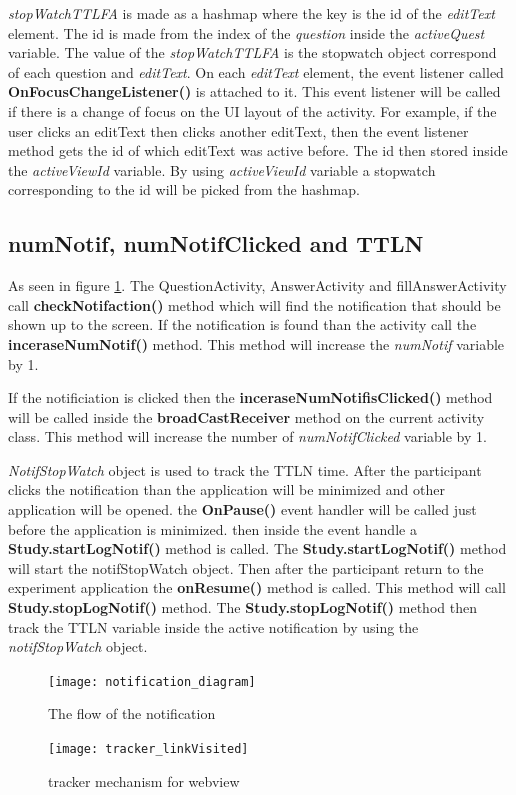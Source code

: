 \textit{stopWatchTTLFA} is made as a hashmap where the key is the id of the \textit{editText} element.
The id is made from the index of the \textit{question} inside the \textit{activeQuest} variable.
The value of the \textit{stopWatchTTLFA} is the stopwatch object correspond of each question and \textit{editText}.
On each \textit{editText} element, the event listener called \textbf{OnFocusChangeListener()} is attached to it. This event listener will be called if there is a
change of focus on the UI layout of the activity. For example, if the user clicks an editText then clicks another editText, then the event listener
 method gets the id of which editText was active before. The id then stored inside the \textit{activeViewId} variable.
By using \textit{activeViewId} variable a stopwatch corresponding to the id will be picked from the hashmap.


\subsection{numNotif, numNotifClicked and TTLN}
As seen in figure \ref{fig:NotificationFlo}. The QuestionActivity, AnswerActivity and fillAnswerActivity  call \textbf{checkNotifaction()} method
which will find the notification that should be shown up to the screen. If the notification is found than the activity call the \textbf{inceraseNumNotif()} method.
This method will increase the \textit{numNotif} variable by 1.

If the notificiation is clicked then the \textbf{inceraseNumNotifisClicked()} method will be called inside the \textbf{broadCastReceiver} method on the current activity class.
This method will increase the number of \textit{numNotifClicked} variable by 1.

\textit{NotifStopWatch} object is used to track the TTLN time.
After the participant clicks the notification than the application will be minimized and other
application will be opened.
 the \textbf{OnPause()} event handler will be called just before the application is minimized.
then inside the event handle a \textbf{Study.startLogNotif()} method is called. The \textbf{Study.startLogNotif()}  method will start the notifStopWatch object.
Then after the participant return to the experiment application the \textbf{onResume()} method is called.
This method will call \textbf{Study.stopLogNotif()} method.
The \textbf{Study.stopLogNotif()} method then track the TTLN variable inside the active notification
by using the \textit{notifStopWatch} object.


\begin{figure}
\begin{center}
\texttt{[image: notification\_diagram]}
\end{center}
\caption{The flow of the notification}
\label{fig:NotificationFlo}
\end{figure}
%
\begin{figure}
\begin{center}
\texttt{[image: tracker\_linkVisited]}
\end{center}
\caption{tracker mechanism for webview}
\label{fig:webViewTrack}
\end{figure}
